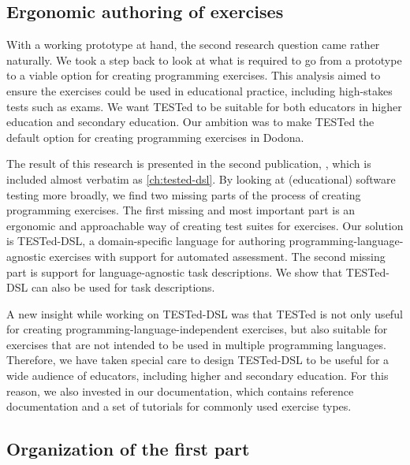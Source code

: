 \documentclass[../main]{subfiles}
\begin{document}
\subsection{Ergonomic authoring of exercises}\label{subsec:ergonomic-testing}

With a working prototype at hand, the second research question came rather naturally.
We took a step back to look at what is required to go from a prototype to a viable option for creating programming exercises.
This analysis aimed to ensure the exercises could be used in educational practice, including high-stakes tests such as exams.
We want TESTed to be suitable for both educators in higher education and secondary education.
Our ambition was to make TESTed the default option for creating programming exercises in Dodona.

The result of this research is presented in the second publication, \textcite{strijbolTESTedDSLDomainspecificLanguage2024}, which is included almost verbatim as \cref{ch:tested-dsl}.
By looking at (educational) software testing more broadly, we find two missing parts of the process of creating programming exercises.
The first missing and most important part is an ergonomic and approachable way of creating test suites for exercises.
Our solution is TESTed-DSL, a domain-specific language for authoring programming-language-agnostic exercises with support for automated assessment.
The second missing part is support for language-agnostic task descriptions.
We show that TESTed-DSL can also be used for task descriptions.

A new insight while working on TESTed-DSL was that TESTed is not only useful for creating programming-language-independent exercises, but also suitable for exercises that are not intended to be used in multiple programming languages.
Therefore, we have taken special care to design TESTed-DSL to be useful for a wide audience of educators, including higher and secondary education.
For this reason, we also invested in our documentation, which contains reference documentation and a set of tutorials for commonly used exercise types.

\subsection{Organization of the first part}\label{subsec:organization-of-the-first-part}
\end{document}
